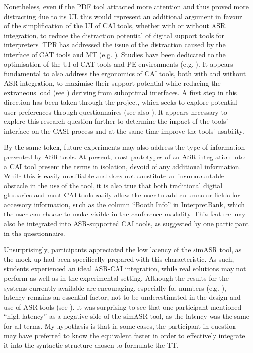 Nonetheless, even if the PDF tool attracted more attention and thus proved more distracting due to its UI, this would represent an additional argument in favour of the simplification of the UI of CAI tools, whether with or without ASR integration, to reduce the distraction potential of digital support tools for interpreters. TPR has addressed the issue of the distraction caused by the interface of CAT tools and MT (e.g. \citealt{OBrien_Ehrensberger-Dow_Connolly_Hasler_2017}). Studies have been dedicated to the optimisation of the UI of CAT tools and PE environments (e.g. \citealt{moorkens_assessing_2016}). It appears fundamental to also address the ergonomics of CAI tools, both with and without ASR integration, to maximise their support potential while reducing the extraneous load (see ) deriving from suboptimal interfaces. A first step in this direction has been taken through the \citet{EABM2021} project, which seeks to explore potential user preferences through questionnaires (see also ). It appears necessary to explore this research question further to determine the impact of the tools' interface on the CASI process and at the same time improve the tools' usability.

By the same token, future experiments may also address the type of information presented by ASR tools. At present, most prototypes of an ASR integration into a CAI tool present the terms in isolation, devoid of any additional information. While this is easily modifiable and does not constitute an insurmountable obstacle in the use of the tool, it is also true that both traditional digital glossaries and most CAI tools easily allow the user to add columns or fields for accessory information, such as the column ``Booth Info'' in InterpretBank, which the user can choose to make visible in the conference modality. This feature may also be integrated into ASR-supported CAI tools, as suggested by one participant in the questionnaire.

Unsurprisingly, participants appreciated the low latency of the simASR tool, as the mock-up had been specifically prepared with this characteristic. As such, students experienced an ideal ASR-CAI integration, while real solutions may not perform as well as in the experimental setting. Although the results for the systems currently available are encouraging, especially for numbers (e.g. \citealt{defrancq_automatic_2020}), latency remains an essential factor, not to be underestimated in the design and use of ASR tools (see \citealt{montecchio_masterarbeit_maddalena_2021}). It was surprising to see that one participant mentioned ``high latency'' as a negative side of the simASR tool, as the latency was the same for all terms. My hypothesis is that in some cases, the participant in question may have preferred to know the equivalent faster in order to effectively integrate it into the syntactic structure chosen to formulate the TT.

